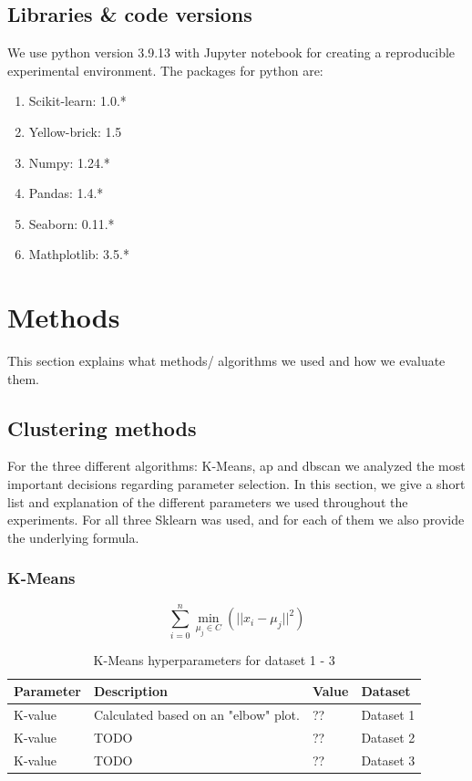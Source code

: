 \subsection{Libraries \& code versions}
We use python version 3.9.13 with Jupyter notebook for creating a reproducible experimental environment.
The packages for python are:
\begin{enumerate}
  \item Scikit-learn: 1.0.*
  \item Yellow-brick: 1.5
  \item Numpy: 1.24.*
  \item Pandas: 1.4.*
  \item Seaborn: 0.11.*
  \item Mathplotlib: 3.5.*
\end{enumerate}

\section{Methods}
This section explains what methods/ algorithms we used and how we evaluate them.
\subsection{Clustering methods}
For the three different algorithms: K-Means, \gls{ap} and \gls{dbscan} we analyzed the most important decisions regarding parameter selection.
In this section, we give a short list and explanation of the different parameters we used throughout the experiments.
For all three Sklearn was used, and for each of them we also provide the underlying formula.
\subsubsection{K-Means}
\begin{equation}
  \sum_{i=0}^{n}\min_{\mu_j \in C}(||x_i - \mu_j||^2)
\end{equation}
\begin{table}[h]
  \begin{tabular}{|l|p{6cm}|l|l|}
    \hline
    Parameter & Description                          & Value & Dataset   \\ \hline
    K-value   & Calculated based on an "elbow" plot. & ??    & Dataset 1 \\ \hline
    K-value   & TODO                                 & ??    & Dataset 2 \\ \hline
    K-value   & TODO                                 & ??    & Dataset 3 \\


    \hline
  \end{tabular}
  \caption{K-Means hyperparameters for dataset 1 - 3}
  \label{tab:kmeans-formula-dataset-2}
\end{table}

